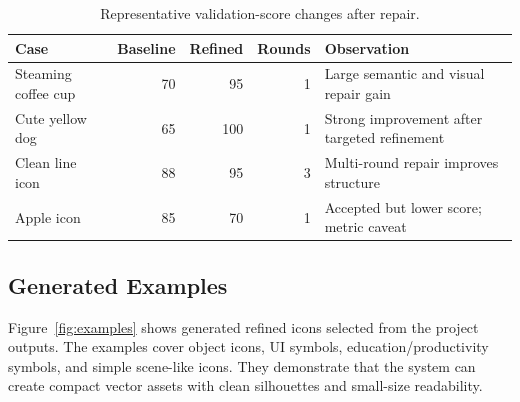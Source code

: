 \documentclass[10pt]{article}
\begin{document}
\begin{table}[t]
\centering
\caption{Representative validation-score changes after repair.}
\label{tab:cases}
\begin{tabularx}{\linewidth}{lrrrl}
\toprule
Case & Baseline & Refined & Rounds & Observation \\
\midrule
Steaming coffee cup & 70 & 95 & 1 & Large semantic and visual repair gain \\
Cute yellow dog & 65 & 100 & 1 & Strong improvement after targeted refinement \\
Clean line icon & 88 & 95 & 3 & Multi-round repair improves structure \\
Apple icon & 85 & 70 & 1 & Accepted but lower score; metric caveat \\
\bottomrule
\end{tabularx}
\end{table}

\subsection{Generated Examples}

Figure~\ref{fig:examples} shows generated refined icons selected from the project outputs.
The examples cover object icons, UI symbols, education/productivity symbols, and simple scene-like icons.
They demonstrate that the system can create compact vector assets with clean silhouettes and small-size readability.
\end{document}
